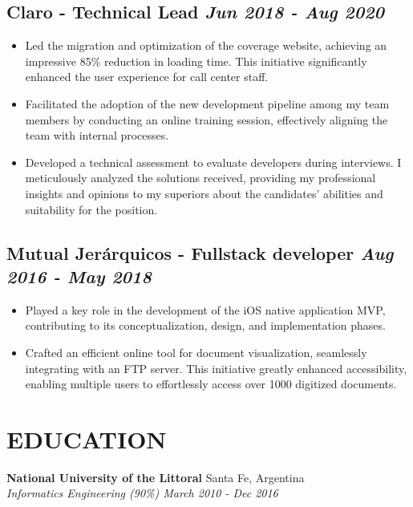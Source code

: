 \documentclass[10pt, a4paper]{article}
\begin{document}
\subsection*{Claro - Technical Lead \hfill \small \textit{Jun 2018 - Aug 2020}}
\begin{itemize}
    \setlength\itemsep{0em}
    \item Led the migration and optimization of the coverage website, achieving an impressive 85\% reduction in loading time. This initiative significantly enhanced the user experience for call center staff.
    \item Facilitated the adoption of the new development pipeline among my team members by conducting an online training session, effectively aligning the team with internal processes.
    \item Developed a technical assessment to evaluate developers during interviews. I meticulously analyzed the solutions received, providing my professional insights and opinions to my superiors about the candidates' abilities and suitability for the position. 
\end{itemize}

\subsection*{Mutual Jer\'arquicos - Fullstack developer \hfill \small \textit{Aug 2016 - May 2018}}
\begin{itemize}
    \setlength\itemsep{0em}
    \item Played a key role in the development of the iOS native application MVP, contributing to its conceptualization, design, and implementation phases.
    \item Crafted an efficient online tool for document visualization, seamlessly integrating with an FTP server. This initiative greatly enhanced accessibility, enabling multiple users to effortlessly access over 1000 digitized documents.
\end{itemize}

\section{EDUCATION}

\textbf{National University of the Littoral} \hfill Santa Fe, Argentina \\
\textit{Informatics Engineering (90\%) \hfill March 2010 - Dec 2016} 
\end{document}
